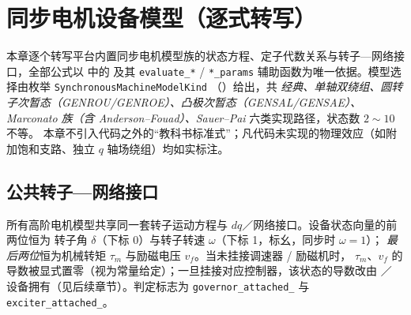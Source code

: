 \section{同步电机设备模型（逐式转写）}
\label{sec:dynamics-device-machines}

本章逐个转写平台内置同步电机模型族的状态方程、定子代数关系与转子—网络接口，全部公式以
 中的
 及其 \texttt{evaluate\_*} / \texttt{*\_params}
辅助函数为唯一依据。模型选择由枚举 \texttt{SynchronousMachineModelKind}
（）给出，共
\emph{经典、单轴双绕组、圆转子次暂态（GENROU/GENROE）、凸极次暂态（GENSAL/GENSAE）、
Marconato 族（含 Anderson--Fouad）、Sauer--Pai} 六类实现路径，状态数 $2\sim10$ 不等。
本章不引入代码之外的“教科书标准式”；凡代码未实现的物理效应（如附加饱和支路、独立
$q$ 轴场绕组）均如实标注。

\subsection{公共转子—网络接口}
\label{sec:dynamics-machine-common}
所有高阶电机模型共享同一套转子运动方程与 $dq$／网络接口。设备状态向量的前两位恒为
转子角 $\delta$（下标 0）与转子转速 $\omega$（下标 1，标幺，同步时 $\omega=1$）；
\emph{最后两位}恒为机械转矩 $\tau_m$ 与励磁电压 $v_f$。当未挂接调速器 / 励磁机时，
$\tau_m$、$v_f$ 的导数被显式置零（视为常量给定）；一旦挂接对应控制器，该状态的导数改由
／ 设备拥有（见后续章节）。判定标志为
\texttt{governor\_attached\_} 与 \texttt{exciter\_attached\_}。

